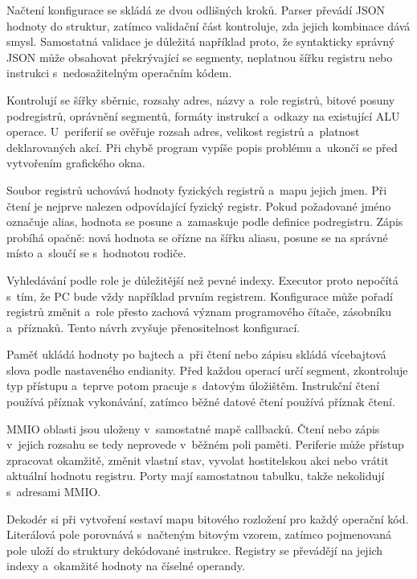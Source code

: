 \documentclass[hidelinks, 12pt]{article}%
\begin{document}
Načtení konfigurace se skládá ze dvou odlišných kroků. Parser převádí JSON hodnoty do struktur, zatímco validační část kontroluje, zda jejich kombinace dává smysl. Samostatná validace je důležitá například proto, že syntakticky správný JSON může obsahovat překrývající se segmenty, neplatnou šířku registru nebo instrukci s~nedosažitelným operačním kódem.

Kontrolují se šířky sběrnic, rozsahy adres, názvy a~role registrů, bitové posuny podregistrů, oprávnění segmentů, formáty instrukcí a~odkazy na existující ALU operace. U~periferií se ověřuje rozsah adres, velikost registrů a~platnost deklarovaných akcí. Při chybě program vypíše popis problému a~ukončí se před vytvořením grafického okna.

Soubor registrů uchovává hodnoty fyzických registrů a~mapu jejich jmen. Při čtení je nejprve nalezen odpovídající fyzický registr. Pokud požadované jméno označuje alias, hodnota se posune a~zamaskuje podle definice podregistru. Zápis probíhá opačně: nová hodnota se ořízne na šířku aliasu, posune se na správné místo a~sloučí se s~hodnotou rodiče.

Vyhledávání podle role je důležitější než pevné indexy. Executor proto nepočítá s~tím, že PC bude vždy například prvním registrem. Konfigurace může pořadí registrů změnit a~role přesto zachová význam programového čítače, zásobníku a~příznaků. Tento návrh zvyšuje přenositelnost konfigurací.

Paměť ukládá hodnoty po bajtech a~při čtení nebo zápisu skládá vícebajtová slova podle nastaveného endianity. Před každou operací určí segment, zkontroluje typ přístupu a~teprve potom pracuje s~datovým úložištěm. Instrukční čtení používá příznak vykonávání, zatímco běžné datové čtení používá příznak čtení.

MMIO oblasti jsou uloženy v~samostatné mapě callbacků. Čtení nebo zápis v~jejich rozsahu se tedy neprovede v~běžném poli paměti. Periferie může přístup zpracovat okamžitě, změnit vlastní stav, vyvolat hostitelskou akci nebo vrátit aktuální hodnotu registru. Porty mají samostatnou tabulku, takže nekolidují s~adresami MMIO.

Dekodér si při vytvoření sestaví mapu bitového rozložení pro každý operační kód. Literálová pole porovnává s~načteným bitovým vzorem, zatímco pojmenovaná pole uloží do struktury dekódované instrukce. Registry se převádějí na jejich indexy a~okamžité hodnoty na číselné operandy.
\end{document}
